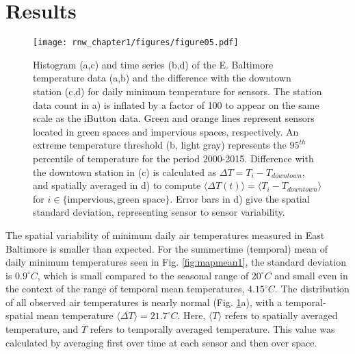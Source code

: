 \section{Results}

\begin{figure}
\noindent\texttt{[image: rnw\_chapter1/figures/figure05.pdf]}
\caption{Histogram (a,c) and time series (b,d) of the E. Baltimore temperature data (a,b) and the difference with the downtown station (c,d) for daily minimum temperature for sensors. The station data count in a) is inflated by a factor of 100 to appear on the same scale as the iButton data. Green and orange lines represent sensors located in green spaces and impervious spaces, respectively. An extreme temperature threshold (b, light gray) represents the $95^{th}$ percentile of temperature for the period 2000-2015. Difference with the downtown station in (c) is calculated as $ {\Delta T} =T_i - T_{downtown}$, and spatially averaged in d) to compute $\langle {\Delta T} \left(t\right) \rangle =\langle T_i - T_{downtown} \rangle $ for $i \in \{ \text{impervious}, \text{green space} \}$. Error bars in d) give the spatial standard deviation, representing sensor to sensor variability.
} \label{fig:histogram1}
\end{figure}


The spatial variability of minimum daily air temperatures measured in East Baltimore is smaller than expected. For the summertime (temporal) mean of daily minimum temperatures seen in Fig. \ref{fig:mapmean1}, the standard deviation is $0.9^{\circ} C$, which is small compared to the seasonal range of $20^{\circ}C$ and small even in the context of the range of temporal mean temperatures, $4.15^{\circ} C$. The distribution of all observed air temperatures is nearly normal (Fig. \ref{fig:histogram1}a), with a temporal-spatial mean temperature $\langle  \overline { \Delta T}  \rangle = 21.7^{\circ} C$.  Here, $\langle T \rangle$ refers to spatially averaged temperature, and $\overline{T}$ refers to temporally averaged temperature. This value was calculated by averaging first over time at each sensor and then over space.

